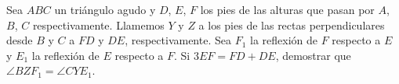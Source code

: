 Sea $ABC$ un triángulo agudo y $D$, $E$, $F$ los pies de las alturas que pasan por $A$, $B$, $C$ respectivamente.  Llamemos $Y$ y $Z$ a los pies de las rectas perpendiculares desde $B$ y $C$ a $FD$ y $DE$, respectivamente. Sea $F_1$ la reflexión de $F$ respecto a $E$ y $E_1$ la reflexión de $E$ respecto a $F$. Si $3EF=FD+DE$, demostrar que $\angle BZF_1=\angle CYE_1$.
